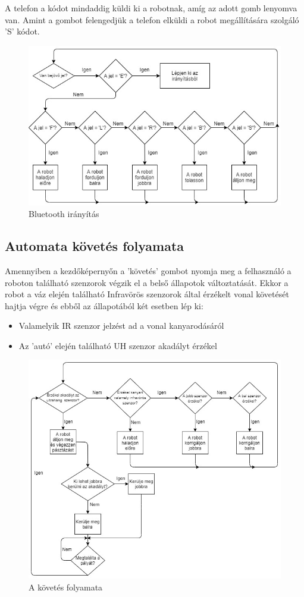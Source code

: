 \documentclass[]{thesis-ekf}
\theoremstyle{definition}
\begin{document}
A telefon a kódot mindaddig küldi ki a robotnak, amíg az adott gomb lenyomva van. Amint a gombot felengedjük a telefon elküldi a robot megállítására szolgáló 'S' kódot.
\begin{figure}[h]
	\centering
	\includegraphics[width=\columnwidth]{images/grafok/iranyitas_graf}
	\caption{Bluetooth irányítás}
	\label{iranyitas_graf}
\end{figure}
\subsection{Automata követés folyamata}\label{followkepernyo_allapot}
Amennyiben a kezdőképernyőn a ’követés’ gombot nyomja meg a felhasználó a roboton található szenzorok végzik el a belső állapotok változtatását.
Ekkor a robot a váz elején található Infravörös szenzorok által érzékelt vonal követését hajtja végre és ebből az állapotából két esetben lép ki:
\begin{itemize}
	\item Valamelyik IR szenzor jelzést ad a vonal kanyarodásáról
	\item Az 'autó' elején található UH szenzor akadályt érzékel
\end{itemize}
\begin{figure}[h]
	\centering
	\includegraphics[width=\columnwidth]{images/grafok/kovetes_graf}
	\caption{A követés folyamata}
	\label{kovetes_graf}
\end{figure}
\end{document}
